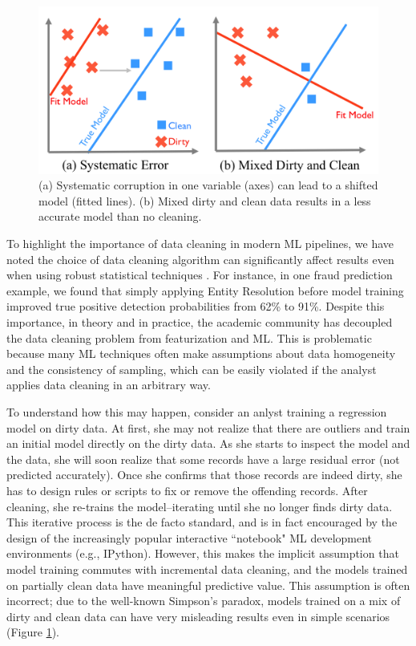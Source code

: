 \begin{figure}[t]
\centering
 \includegraphics[width=\columnwidth]{figs/update-arch.png}
 \caption{(a) Systematic corruption in one variable (axes) can lead to a shifted model (fitted lines). 
 (b) Mixed dirty and clean data results in a less accurate model than no cleaning.\label{update-arch1}}\vspace{-1em}
\end{figure}

To highlight the importance of data cleaning in modern ML pipelines, we have noted the choice of data cleaning algorithm can significantly affect results even when using robust statistical techniques \cite{activecleanarxiv, DBLP:conf/case/MahlerKLSMKPWFAG14}.
For instance, in one fraud prediction example, we found that simply applying Entity Resolution before model training improved true positive detection probabilities from 62\% to 91\%. 
Despite this importance, in theory and in practice, the academic community has decoupled the data cleaning problem from featurization and ML.
This is problematic because many ML techniques often make assumptions about data homogeneity and the consistency of sampling, which can be easily violated if the analyst applies data cleaning in an arbitrary way.

To understand how this may happen, consider an anlyst training a regression model on dirty data. At first, she may not realize that there are outliers and train an initial model directly on the dirty data. 
As she starts to inspect the model and the data, she will soon realize that some records have a large residual error (not predicted accurately). 
Once she confirms that those records are indeed dirty, she has to design rules or scripts to fix or remove the offending records. 
After cleaning, she re-trains the model--iterating until she no longer finds dirty data.
This iterative process is the de facto standard, and is in fact encouraged by the design of the increasingly popular interactive ``notebook" ML development environments (e.g., IPython).
However, this makes the implicit assumption that model training commutes with incremental data cleaning, and the models trained on partially clean data have meaningful predictive value.
This assumption is often incorrect; due to the well-known Simpson's paradox, models trained on a mix of dirty and clean data can have very misleading results even in simple scenarios (Figure \ref{update-arch1}).

